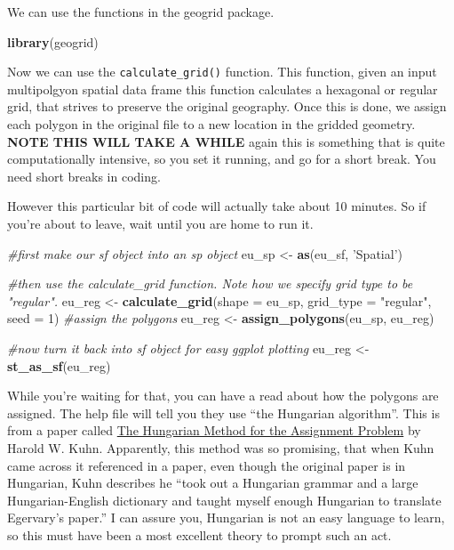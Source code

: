 \documentclass[]{book}
\newenvironment{Shaded}{\begin{snugshade}}{\end{snugshade}}
\newcommand{\CommentTok}[1]{\textcolor[rgb]{0.56,0.35,0.01}{\textit{#1}}}
\newcommand{\DataTypeTok}[1]{\textcolor[rgb]{0.13,0.29,0.53}{#1}}
\newcommand{\DecValTok}[1]{\textcolor[rgb]{0.00,0.00,0.81}{#1}}
\newcommand{\KeywordTok}[1]{\textcolor[rgb]{0.13,0.29,0.53}{\textbf{#1}}}
\newcommand{\NormalTok}[1]{#1}
\newcommand{\StringTok}[1]{\textcolor[rgb]{0.31,0.60,0.02}{#1}}
\begin{document}
We can use the functions in the geogrid package.

\begin{Shaded}
\begin{Highlighting}[]
\KeywordTok{library}\NormalTok{(geogrid)}
\end{Highlighting}
\end{Shaded}

Now we can use the \texttt{calculate\_grid()} function. This function, given an input multipolgyon spatial data frame this function calculates a hexagonal or regular grid, that strives to preserve the original geography. Once this is done, we assign each polygon in the original file to a new location in the gridded geometry. \textbf{NOTE THIS WILL TAKE A WHILE} again this is something that is quite computationally intensive, so you set it running, and go for a short break. You need short breaks in coding.

However this particular bit of code will actually take about 10 minutes. So if you're about to leave, wait until you are home to run it.

\begin{Shaded}
\begin{Highlighting}[]
\CommentTok{#first make our sf object into an sp object}
\NormalTok{eu_sp <-}\StringTok{ }\KeywordTok{as}\NormalTok{(eu_sf, }\StringTok{'Spatial'}\NormalTok{)}

\CommentTok{#then use the calculate_grid function. Note how we specify grid type to be "regular".}
\NormalTok{eu_reg <-}\StringTok{ }\KeywordTok{calculate_grid}\NormalTok{(}\DataTypeTok{shape =}\NormalTok{ eu_sp, }\DataTypeTok{grid_type =} \StringTok{"regular"}\NormalTok{, }\DataTypeTok{seed =} \DecValTok{1}\NormalTok{)}
\CommentTok{#assign the polygons}
\NormalTok{eu_reg <-}\StringTok{ }\KeywordTok{assign_polygons}\NormalTok{(eu_sp, eu_reg)}

\CommentTok{#now turn it back into sf object for easy ggplot plotting}
\NormalTok{eu_reg <-}\StringTok{ }\KeywordTok{st_as_sf}\NormalTok{(eu_reg)}
\end{Highlighting}
\end{Shaded}

While you're waiting for that, you can have a read about how the polygons are assigned. The help file will tell you they use ``the Hungarian algorithm''. This is from a paper called \href{https://pdfs.semanticscholar.org/b6a0/f30260302a2001da9999096cfdd89bc1f7fb.pdf}{The Hungarian Method for the Assignment Problem} by Harold W. Kuhn. Apparently, this method was so promising, that when Kuhn came across it referenced in a paper, even though the original paper is in Hungarian, Kuhn describes he ``took out a Hungarian grammar and a large Hungarian-English dictionary and taught myself enough Hungarian to translate Egervary's paper.'' I can assure you, Hungarian is not an easy language to learn, so this must have been a most excellent theory to prompt such an act.
\end{document}
